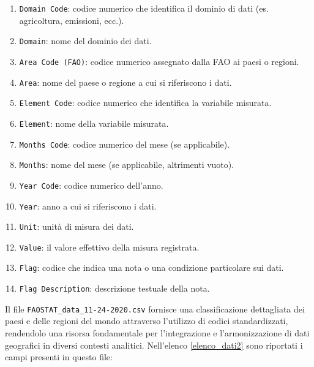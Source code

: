 \begin{enumerate}
\label{elenco_dati1}
    \item \texttt{Domain Code}: codice numerico che identifica il dominio di dati (es. agricoltura, emissioni, ecc.).
    \item \texttt{Domain}: nome del dominio dei dati.
    \item \texttt{Area Code (FAO)}: codice numerico assegnato dalla FAO ai paesi o regioni.
    \item \texttt{Area}: nome del paese o regione a cui si riferiscono i dati.
    \item \texttt{Element Code}: codice numerico che identifica la variabile misurata.
    \item \texttt{Element}: nome della variabile misurata.
    \item \texttt{Months Code}: codice numerico del mese (se applicabile).
    \item \texttt{Months}: nome del mese (se applicabile, altrimenti vuoto).
    \item \texttt{Year Code}: codice numerico dell'anno.
    \item \texttt{Year}: anno a cui si riferiscono i dati.
    \item \texttt{Unit}: unità di misura dei dati.
    \item \texttt{Value}: il valore effettivo della misura registrata.
    \item \texttt{Flag}: codice che indica una nota o una condizione particolare sui dati.
    \item \texttt{Flag Description}: descrizione testuale della nota.
\end{enumerate}
\vspace{2mm}
Il file \texttt{FAOSTAT\_data\_11-24-2020.csv} fornisce una classificazione dettagliata dei paesi e delle regioni del mondo attraverso l’utilizzo di codici standardizzati, rendendolo una risorsa fondamentale per l’integrazione e l’armonizzazione di dati geografici in diversi contesti analitici. Nell'elenco \ref{elenco_dati2} sono riportati i campi presenti in questo file:
\vspace{2mm}
